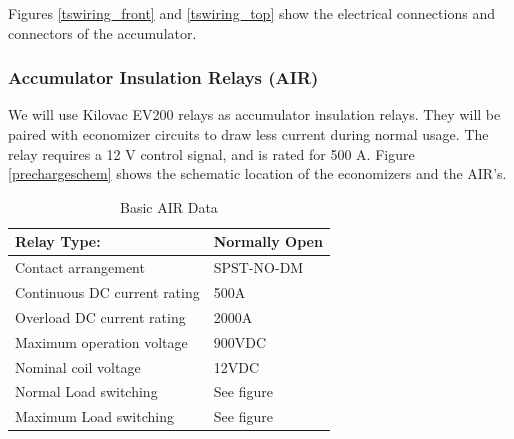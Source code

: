 \documentclass{article}
\begin{document}
            Figures \ref{tswiring_front} and \ref{tswiring_top} show the electrical connections and connectors of the accumulator.

        \subsubsection{Accumulator Insulation Relays (AIR)} \label{airs}


            We will use Kilovac EV200 relays as accumulator insulation relays. They will be paired with economizer circuits to draw less current during normal usage. The relay requires a 12 V control signal, and is rated for 500 A. Figure \ref{prechargeschem} shows the schematic location of the economizers and the AIR's.

            \begin{table}[H]
                \centering
                \begin{tabular}{|l|l|}
                    \hline
                    Relay Type: & Normally Open \\ \hline
                    Contact arrangement & SPST-NO-DM \\ \hline
                    Continuous DC current rating & 500A \\ \hline
                    Overload DC current rating & 2000A \\ \hline
                    Maximum operation voltage & 900VDC \\ \hline
                    Nominal coil voltage & 12VDC \\ \hline
                    Normal Load switching & See figure \\ \hline
                    Maximum Load switching & See figure \\ \hline
                \end{tabular}
                \caption{Basic AIR Data}
                \label{air}
            \end{table}
\end{document}
